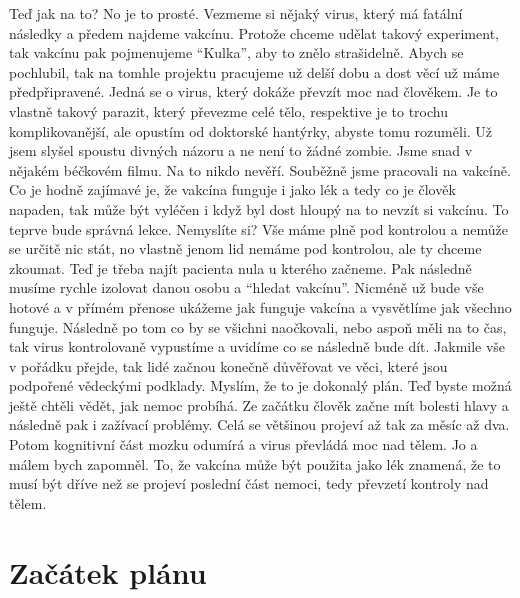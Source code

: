 Teď jak na to? No je to prosté. Vezmeme si nějaký virus, který má fatální následky a předem najdeme vakcínu. Protože chceme udělat takový experiment, tak vakcínu pak pojmenujeme “Kulka”, aby to znělo strašidelně. Abych se pochlubil, tak na tomhle projektu pracujeme už delší dobu a dost věcí už máme předpřipravené. Jedná se o virus, který dokáže převzít moc nad člověkem. Je to vlastně takový parazit, který převezme celé tělo, respektive je to trochu komplikovanější, ale opustím od doktorské hantýrky, abyste tomu rozuměli. Už jsem slyšel spoustu divných názoru a ne není to žádné zombie. Jsme snad v nějakém béčkovém filmu. Na to nikdo nevěří. Souběžně jsme pracovali na vakcíně. Co je hodně zajímavé je, že vakcína funguje i jako lék a tedy co je člověk napaden, tak může být vyléčen i když byl dost hloupý na to nevzít si vakcínu. To teprve bude správná lekce. Nemyslíte si? Vše máme plně pod kontrolou a nemůže se určitě nic stát, no vlastně jenom lid nemáme pod kontrolou, ale ty chceme zkoumat. Teď je třeba najít pacienta nula u kterého začneme. Pak následně musíme rychle izolovat danou osobu a “hledat vakcínu”. Nicméně už bude vše hotové a v přímém přenose ukážeme jak funguje vakcína a vysvětlíme jak všechno funguje. Následně po tom co by se všichni naočkovali, nebo aspoň měli na to čas, tak virus kontrolovaně vypustíme a uvidíme co se následně bude dít. Jakmile vše v pořádku přejde, tak lidé začnou konečně důvěřovat ve věci, které jsou podpořené vědeckými podklady. Myslím, že to je dokonalý plán. Teď byste možná ještě chtěli vědět, jak nemoc probíhá. Ze začátku člověk začne mít bolesti hlavy a následně pak i zažívací problémy. Celá se většinou projeví až tak za měsíc až dva. Potom kognitivní část mozku odumírá a virus převládá moc nad tělem. Jo a málem bych zapomněl. To, že vakcína může být použita jako lék znamená, že to musí být dříve než se projeví poslední část nemoci, tedy převzetí kontroly nad tělem.

\section{Začátek plánu}

